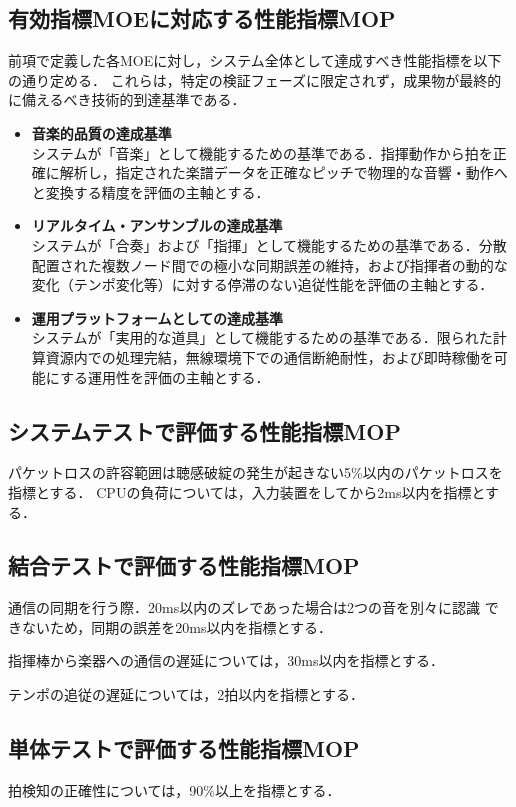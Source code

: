 \documentclass[lualatex,book,paper=a4paper,jafontsize=11.5pt,jafontscale=1.05]{jlreq}
\begin{document}
\subsection{有効指標MOEに対応する性能指標MOP}
前項で定義した各MOEに対し，システム全体として達成すべき性能指標を以下の通り定める．
これらは，特定の検証フェーズに限定されず，成果物が最終的に備えるべき技術的到達基準である．
\begin{itemize}
 \item{\textbf{音楽的品質の達成基準}}\\
  システムが「音楽」として機能するための基準である．指揮動作から拍を正確に解析し，指定された楽譜データを正確なピッチで物理的な音響・動作へと変換する精度を評価の主軸とする．
 \item{\textbf{リアルタイム・アンサンブルの達成基準}}\\
  システムが「合奏」および「指揮」として機能するための基準である．分散配置された複数ノード間での極小な同期誤差の維持，および指揮者の動的な変化（テンポ変化等）に対する停滞のない追従性能を評価の主軸とする．
 \item{\textbf{運用プラットフォームとしての達成基準}}\\
  システムが「実用的な道具」として機能するための基準である．限られた計算資源内での処理完結，無線環境下での通信断絶耐性，および即時稼働を可能にする運用性を評価の主軸とする．
\end{itemize}

\subsection{システムテストで評価する性能指標MOP}
パケットロスの許容範囲は聴感破綻の発生が起きない5\%以内のパケットロスを指標とする．
CPUの負荷については，入力装置をしてから2ms以内を指標とする．

\subsection{結合テストで評価する性能指標MOP}
通信の同期を行う際．20ms以内のズレであった場合は2つの音を別々に認識
できないため，同期の誤差を20ms以内を指標とする\cite{ref:douki}．

指揮棒から楽器への通信の遅延については，30ms以内を指標とする．

テンポの追従の遅延については，2拍以内を指標とする．
\subsection{単体テストで評価する性能指標MOP}
拍検知の正確性については，90\%以上を指標とする．
\end{document}
